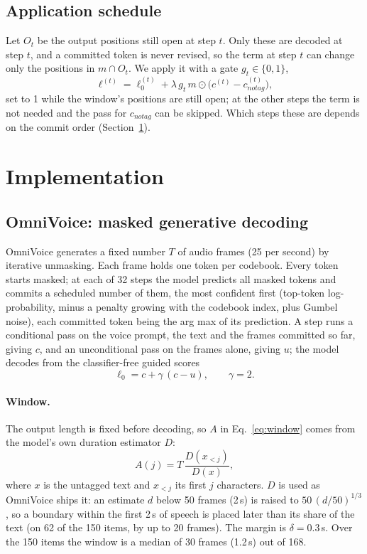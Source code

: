 \documentclass[11pt]{article}
\newcommand{\nt}{\textit{notag}}
\begin{document}
\subsection{Application schedule}
\label{sec:when}
Let $O_t$ be the output positions still open at step $t$. Only these are decoded at step $t$, and a committed token is never revised, so the term at step $t$ can change only the positions in $m \cap O_t$. We apply it with a gate $g_t \in \{0, 1\}$,
\begin{equation}
\ell^{(t)} = \ell_0^{(t)} + \lambda\, g_t\, m \odot \big(c^{(t)} - c_{\nt}^{(t)}\big),
\label{eq:gate}
\end{equation}
set to 1 while the window's positions are still open; at the other steps the term is not needed and the pass for $c_{\nt}$ can be skipped. Which steps these are depends on the commit order (Section~\ref{sec:impl}).

\section{Implementation}
\label{sec:impl}

\subsection{OmniVoice: masked generative decoding}
\label{sec:impl-omni}
OmniVoice \citep{zhu2026omnivoice} generates a fixed number $T$ of audio frames (25 per second) by iterative unmasking. Each frame holds one token per codebook. Every token starts masked; at each of 32 steps the model predicts all masked tokens and commits a scheduled number of them, the most confident first (top-token log-probability, minus a penalty growing with the codebook index, plus Gumbel noise), each committed token being the arg max of its prediction. A step runs a conditional pass on the voice prompt, the text and the frames committed so far, giving $c$, and an unconditional pass on the frames alone, giving $u$; the model decodes from the classifier-free guided scores \citep{ho2022cfg}
\begin{equation}
\ell_0 = c + \gamma\,(c-u), \qquad \gamma = 2 .
\label{eq:cfg}
\end{equation}

\paragraph{Window.} The output length is fixed before decoding, so $A$ in Eq.~\eqref{eq:window} comes from the model's own duration estimator $D$:
\begin{equation}
A(j) = T\,\frac{D(x_{<j})}{D(x)},
\label{eq:align}
\end{equation}
where $x$ is the untagged text and $x_{<j}$ its first $j$ characters. $D$ is used as OmniVoice ships it: an estimate $d$ below 50 frames (2\,s) is raised to $50\,(d/50)^{1/3}$, so a boundary within the first 2\,s of speech is placed later than its share of the text (on 62 of the 150 items, by up to 20 frames). The margin is $\delta = 0.3$\,s. Over the 150 items the window is a median of 30 frames (1.2\,s) out of 168.
\end{document}
